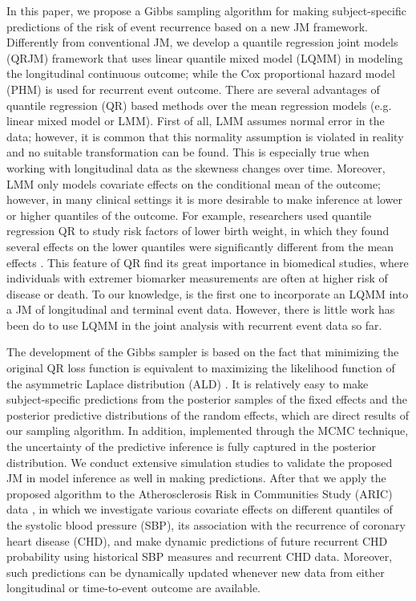 In this paper, we propose a Gibbs sampling algorithm for making subject-specific predictions of the risk of event recurrence based on a new JM framework. Differently from conventional JM, we develop a quantile regression joint models (QRJM) framework that uses linear quantile mixed model (LQMM) in modeling the longitudinal continuous outcome; while the Cox proportional hazard model (PHM) is used for recurrent event outcome. There are several advantages of quantile regression (QR) based methods over the mean regression models (e.g. linear mixed model or LMM). First of all, LMM assumes normal error in the data; however, it is common that this normality assumption is violated in reality and no suitable transformation can be found. This is especially true when working with longitudinal data as the skewness changes over time. Moreover, LMM only models covariate effects on the conditional mean of the outcome; however, in many clinical settings it is more desirable to make inference at lower or higher quantiles of the outcome. For example, researchers used quantile regression QR to study risk factors of lower birth weight, in which they found several effects on the lower quantiles were significantly different from the mean effects \citep{koenker2001quantile}. This feature of QR find its great importance in biomedical studies, where individuals with extremer biomarker measurements are often at higher risk of disease or death. To our knowledge, \cite{farcomeni2015longitudinal} is the first one to incorporate an LQMM into a JM of longitudinal and terminal event data. However, there is little work has been do to use LQMM in the joint analysis with recurrent event data so far.


The development of the Gibbs sampler is based on the fact that minimizing the original QR loss function is equivalent to maximizing the likelihood function of the asymmetric Laplace distribution (ALD) \citep{yu2001bayesian}. It is relatively easy to make subject-specific predictions from the posterior samples of the fixed effects and the posterior predictive distributions of the random effects, which are direct results of our sampling algorithm. In addition, implemented through the MCMC technique, the uncertainty of the predictive inference is fully captured in the posterior distribution. We conduct extensive simulation studies to validate the proposed JM in model inference as well in making predictions. After that we apply the proposed algorithm to the Atherosclerosis Risk in Communities Study (ARIC) data \citep{aric1989atherosclerosis}, in which we investigate various covariate effects on different quantiles of the systolic blood pressure (SBP), its association with the recurrence of coronary heart disease (CHD), and make dynamic predictions of future recurrent CHD probability using historical SBP measures and recurrent CHD data. Moreover, such predictions can be dynamically updated whenever new data from either longitudinal or time-to-event outcome are available.

